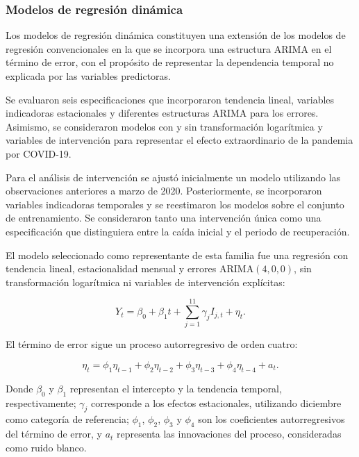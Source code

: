 \documentclass[12pt]{article}
\begin{document}
\subsubsection{Modelos de regresión dinámica}

Los modelos de regresión dinámica constituyen una 
extensión de los modelos de regresión convencionales 
en la que se incorpora una estructura ARIMA en el 
término de error, con el propósito de representar 
la dependencia temporal no explicada por las 
variables predictoras.

Se evaluaron seis especificaciones que incorporaron 
tendencia lineal, variables indicadoras estacionales 
y diferentes estructuras ARIMA para los errores. 
Asimismo, se consideraron modelos con y sin 
transformación logarítmica y variables de intervención 
para representar el efecto extraordinario de la 
pandemia por COVID-19.

Para el análisis de intervención se ajustó inicialmente 
un modelo utilizando las observaciones anteriores a 
marzo de 2020. Posteriormente, se incorporaron 
variables indicadoras temporales y se reestimaron 
los modelos sobre el conjunto de entrenamiento. 
Se consideraron tanto una intervención única como 
una especificación que distinguiera entre la caída 
inicial y el periodo de recuperación.

El modelo seleccionado como representante de esta 
familia fue una regresión con tendencia lineal, 
estacionalidad mensual y errores ARIMA$(4,0,0)$, 
sin transformación logarítmica ni variables de 
intervención explícitas:

\begin{equation}
Y_t=\beta_0+\beta_1t+
\sum_{j=1}^{11}\gamma_j I_{j,t}+\eta_t.
\label{eq:regresion_dinamica}
\end{equation}

El término de error sigue un proceso autorregresivo 
de orden cuatro:

\begin{equation}
\eta_t=\phi_1\eta_{t-1}+
\phi_2\eta_{t-2}+
\phi_3\eta_{t-3}+
\phi_4\eta_{t-4}+a_t.
\label{eq:errores_ar4}
\end{equation}

Donde $\beta_0$ y $\beta_1$ representan el intercepto 
y la tendencia temporal, respectivamente; $\gamma_j$ 
corresponde a los efectos estacionales, utilizando 
diciembre como categoría de referencia; $\phi_1$, 
$\phi_2$, $\phi_3$ y $\phi_4$ son los coeficientes 
autorregresivos del término de error, y $a_t$ 
representa las innovaciones del proceso, consideradas 
como ruido blanco.
\end{document}
